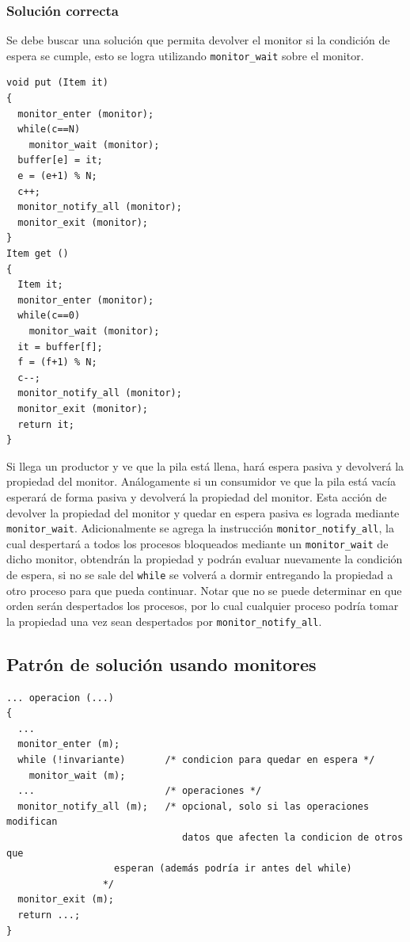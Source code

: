 \subsubsection{Solución correcta}
Se debe buscar una solución que permita devolver el monitor si la condición de
espera se cumple, esto se logra utilizando \texttt{monitor\_wait} sobre el
monitor.

\begin{lstlisting}
void put (Item it)
{
  monitor_enter (monitor);
  while(c==N)
    monitor_wait (monitor);
  buffer[e] = it;
  e = (e+1) % N;
  c++;
  monitor_notify_all (monitor);
  monitor_exit (monitor);
}
Item get ()
{
  Item it;
  monitor_enter (monitor);
  while(c==0)
    monitor_wait (monitor);
  it = buffer[f];
  f = (f+1) % N;
  c--;
  monitor_notify_all (monitor);
  monitor_exit (monitor);
  return it;
}
\end{lstlisting}

Si llega un productor y ve que la pila está llena, hará espera pasiva y
devolverá la propiedad del monitor. Análogamente si un consumidor ve que la pila
está vacía esperará de forma pasiva y devolverá la propiedad del monitor. Esta
acción de devolver la propiedad del monitor y quedar en espera pasiva es lograda
mediante \texttt{monitor\_wait}. Adicionalmente se agrega la instrucción
\texttt{monitor\_notify\_all}, la cual despertará a todos los procesos
bloqueados mediante un \texttt{monitor\_wait} de dicho monitor, obtendrán la
propiedad y podrán evaluar nuevamente la condición de espera, si no se sale del
\texttt{while} se volverá a dormir entregando la propiedad a otro proceso para
que pueda continuar. Notar que no se puede determinar en que orden serán
despertados los procesos, por lo cual cualquier proceso podría tomar la
propiedad una vez sean despertados por \texttt{monitor\_notify\_all}.

\subsection{Patrón de solución usando monitores}

\begin{lstlisting}
... operacion (...)
{
  ...
  monitor_enter (m);
  while (!invariante)       /* condicion para quedar en espera */
    monitor_wait (m);
  ...                       /* operaciones */
  monitor_notify_all (m);   /* opcional, solo si las operaciones modifican
                               datos que afecten la condicion de otros que
			       esperan (además podría ir antes del while)
			     */
  monitor_exit (m);
  return ...;
}
\end{lstlisting}

